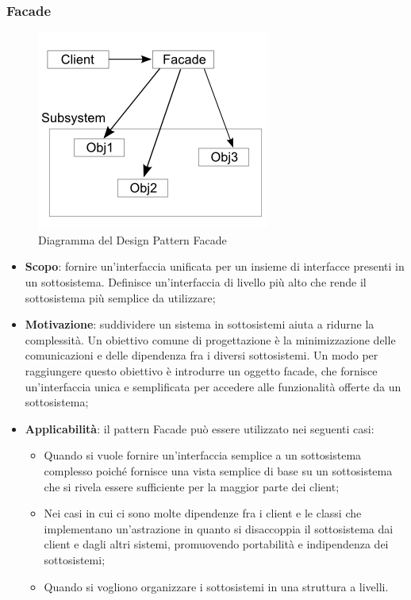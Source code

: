 		\subsubsection{Facade}
		\begin{figure}[H]
		\centering
		\includegraphics[width=0.4\linewidth]{GraficiAppendici/facade.png}
		\caption{Diagramma del Design Pattern Facade}
	\end{figure}
		\begin{itemize}
		\item \textbf{Scopo}: fornire un’interfaccia unificata per un insieme di interfacce presenti in un
sottosistema. Definisce un’interfaccia di livello più alto che rende il sottosistema più semplice da utilizzare;
		\item \textbf{Motivazione}: suddividere un sistema in sottosistemi aiuta a ridurne la complessità.
Un obiettivo comune di progettazione è la minimizzazione delle comunicazioni e delle dipendenza fra i diversi sottosistemi. Un modo per raggiungere questo obiettivo è introdurre un oggetto facade, che fornisce un’interfaccia unica e semplificata per accedere alle funzionalità offerte da un sottosistema;
		\item \textbf{Applicabilità}: il pattern Facade può essere utilizzato nei seguenti casi:
		\begin{itemize}
		\item Quando si vuole fornire un’interfaccia semplice a un sottosistema complesso poiché fornisce una vista semplice di base su un sottosistema che si rivela essere sufficiente per la maggior parte dei client;
		\item Nei casi in cui ci sono molte dipendenze fra i client e le classi che implementano un’astrazione in quanto si disaccoppia il sottosistema dai client e dagli altri sistemi, promuovendo portabilità e indipendenza dei sottosistemi;
		\item Quando si vogliono organizzare i sottosistemi in una struttura a livelli.
		\end{itemize}

		\end{itemize}
	
